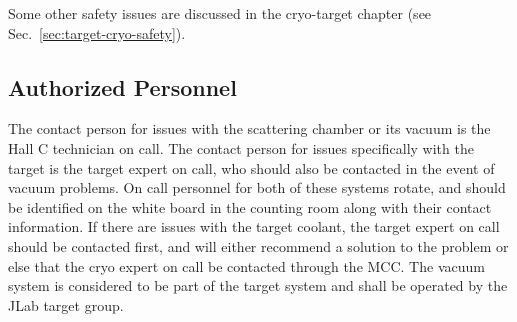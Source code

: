 \begin{safetyen}{0}{0}
\begin{list}{.~}{\setlength{\itemsep}{-0.15cm}}
\end{list}

Some other safety issues are discussed in the cryo-target chapter 
(see Sec.~\ref{sec:target-cryo-safety}).

\subsection[Authorized  Personnel]{Authorized  Personnel}

The contact person for issues with the scattering chamber or its vacuum is the Hall C technician on call. The contact person for issues specifically with the target is the target expert on call, who should also be contacted in the event of vacuum problems.  On call personnel for both of these systems rotate, and should be identified on the white board in the counting room along with their contact information.
If there are issues with the target coolant, the target expert on call should be contacted first, and will either recommend a solution to the problem or else that the cryo expert on call be contacted through the MCC. The vacuum system is considered to be part of the target system and shall be operated by the JLab target group.
\end{safetyen}

%

